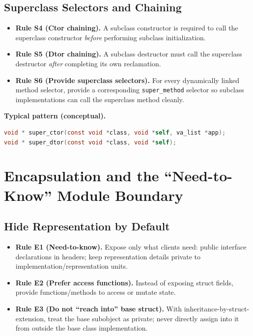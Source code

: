 \documentclass[11pt]{article}
\begin{document}
\subsection{Superclass Selectors and Chaining}

\begin{itemize}
  \item \textbf{Rule S4 (Ctor chaining).} A subclass constructor is required to call the superclass constructor \emph{before} performing subclass initialization.
  \item \textbf{Rule S5 (Dtor chaining).} A subclass destructor must call the superclass destructor \emph{after} completing its own reclamation.
  \item \textbf{Rule S6 (Provide superclass selectors).} For every dynamically linked method selector, provide a corresponding \texttt{super\_method} selector so subclass implementations can call the superclass method cleanly.
\end{itemize}

\noindent\textbf{Typical pattern (conceptual).}
\begin{lstlisting}[language=C]
void * super_ctor(const void *class, void *self, va_list *app);
void * super_dtor(const void *class, void *self);
\end{lstlisting}

\section{Encapsulation and the ``Need-to-Know'' Module Boundary}

\subsection{Hide Representation by Default}

\begin{itemize}
  \item \textbf{Rule E1 (Need-to-know).} Expose only what clients need: public interface declarations in headers; keep representation details private to implementation/representation units.
  \item \textbf{Rule E2 (Prefer access functions).} Instead of exposing struct fields, provide functions/methods to access or mutate state.
  \item \textbf{Rule E3 (Do not ``reach into'' base struct).} With inheritance-by-struct-extension, treat the base subobject as private; never directly assign into it from outside the base class implementation.
\end{itemize}
\end{document}
